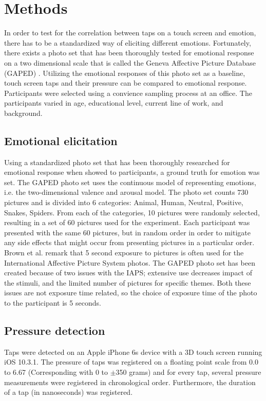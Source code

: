 \documentclass{sigchi}
\begin{document}
\section{Methods} %
\label{sec:methods}
In order to test for the correlation between taps on a touch screen and emotion, there has to be a standardized way of eliciting different emotions. Fortunately, there exists a photo set that has been thoroughly tested for emotional response on a two dimensional scale that is called the Geneva Affective Picture Database (GAPED) \cite{Dan-glauser2011}. Utilizing the emotional responses of this photo set as a baseline, touch screen taps and their pressure can be compared to emotional response.
Participants were selected using a convience sampling process at an office. The participants varied in age, educational level, current line of work, and background.

\subsection{Emotional elicitation} %
\label{sub:emotional_elicitation}
Using a standardized photo set that has been thoroughly researched for emotional response when showed to participants, a ground truth for emotion was set. The GAPED photo set uses the continuous model of representing emotions, i.e. the two-dimensional valence and arousal model. The photo set counts 730 pictures and is divided into 6 categories: Animal, Human, Neutral, Positive, Snakes, Spiders. From each of the categories, 10 pictures were randomly selected, resulting in a set of 60 pictures used for the experiment. Each participant was presented with the same 60 pictures, but in random order in order to mitigate any side effects that might occur from presenting pictures in a particular order. Brown et al. \cite{Neuroscience2012} remark that 5 second exposure to pictures is often used for the International Affective Picture System photos. The GAPED photo set has been created because of two issues with the IAPS; extensive use decreases impact of the stimuli, and the limited number of pictures for specific themes. Both these issues are not exposure time related, so the choice of exposure time of the photo to the participant is 5 seconds.


\subsection{Pressure detection} %
\label{sub:pressure_detection}
Taps were detected on an Apple iPhone 6s device with a 3D touch screen running iOS 10.3.1. The pressure of taps was registered on a floating point scale from 0.0 to 6.67 (Corresponding with 0 to $\pm$350 grams) and for every tap, several pressure measurements were registered in chronological order. Furthermore, the duration of a tap (in nanoseconds) was registered.
\end{document}
